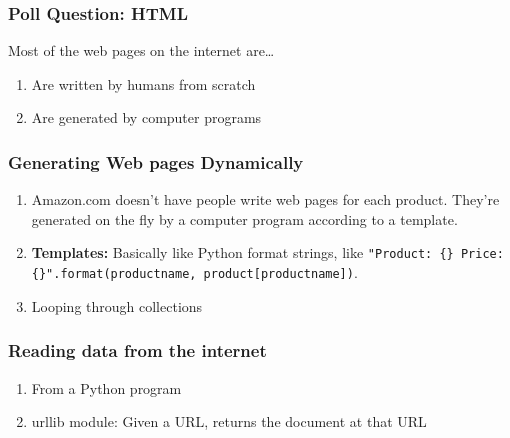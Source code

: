 \documentclass{beamer}
\begin{document}
%
%
\begin{frame}[fragile]
  \frametitle{Poll Question: HTML}
  Most of the web pages on the internet are\ldots
  \begin{enumerate}[A]
    \item Are written by humans from scratch
    \item Are generated by computer programs
  \end{enumerate}
\end{frame}

%
%
\begin{frame}[fragile]
  \frametitle{Generating Web pages Dynamically}
  \begin{enumerate}[A]
    \item Amazon.com doesn't have people write web pages for each product. They're generated on the fly by a computer program according to a template.
    \item \textbf{Templates: } Basically like Python format strings, like \lstinline|"Product: {} Price: {}".format(productname, product[productname])|.
    \item Looping through collections
  \end{enumerate}
\end{frame}

%
%
\begin{frame}[fragile]
  \frametitle{Reading data from the internet}
  \begin{enumerate}[A]
    \item From a Python program
    \item urllib module: Given a URL, returns the document at that URL
  \end{enumerate}
\end{frame}
\end{document}
